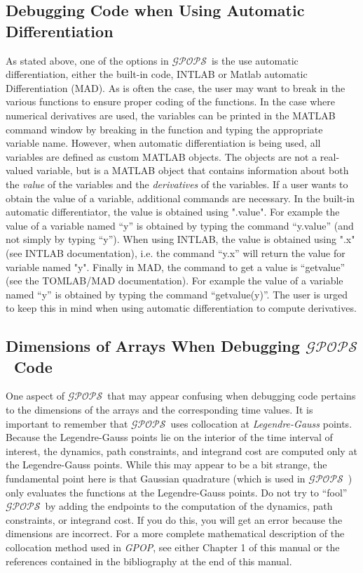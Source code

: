 \documentclass[10pt,final]{report}
\newcommand{\gpops}{$\mathcal{GPOPS}$~}
\newcounter{example}[chapter]
\begin{document}
\subsection{Debugging Code when Using Automatic Differentiation}

As stated above, one of the options in \gpops is the use automatic differentiation, either the built-in code, INTLAB or Matlab automatic Differentiation (MAD). As is often the case, the user may want to break
in the various functions to ensure proper coding of the functions.  In
the case where numerical derivatives are used, the variables can be
printed in the MATLAB command window by breaking in the function and
typing the appropriate variable name.  However, when automatic differentiation is being
used, all variables are defined as custom MATLAB objects. The objects are not a
real-valued variable, but is a MATLAB object that contains information
about both the {\em value} of the variables and the {\em derivatives}
of the variables.  If a user wants to obtain the value of a variable, additional commands are necessary.  In the built-in automatic differentiator, the value is obtained using ".value".  For example the value of a variable named ``y'' is obtained by
typing the command ``y.value'' (and not simply by typing ``y'').  When using INTLAB, the value is obtained using ".x" (see INTLAB documentation), i.e. the command ``y.x'' will return the value for variable named "y".  Finally in MAD, the command to get a value is ``getvalue'' (see the TOMLAB/MAD documentation).  For example the value of a variable named ``y'' is obtained by
typing the command ``getvalue(y)''.
The user is urged to keep this in mind when using automatic differentiation to compute
derivatives.


\subsection{Dimensions of Arrays When Debugging \gpops Code}

One aspect of \gpops that may appear confusing when debugging
code pertains to the dimensions of the arrays and the corresponding
time values.  It is important to remember that \gpops uses
collocation at {\em Legendre-Gauss} points.  Because the
Legendre-Gauss points lie on the interior of the time interval of
interest, the dynamics, path constraints, and integrand cost are
computed only at the Legendre-Gauss points.  While this may appear to
be a bit strange, the fundamental point here is that Gaussian
quadrature (which is used in \gpops) only evaluates the functions
at the Legendre-Gauss points.  Do not try to ``fool'' \gpops by
adding the endpoints to the computation of the dynamics, path
constraints, or integrand cost.  If you do this, you will get an error
because the dimensions are incorrect.  For a more complete
mathematical description of the collocation method used in
{\em GPOP}, see either Chapter 1 of this manual or the references
contained in the bibliography at the end of this manual.
\end{document}
